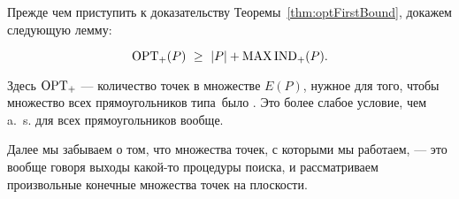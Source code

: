 Прежде чем приступить к доказательству Теоремы~\ref{thm:optFirstBound}, докажем следующую лемму:

\begin{lemma} \label{lm:optPlusBound}
\begin{equation}
	\label{eq:optPlusBound}
	\opt_+(P)\ \ge\ |P| + \maxind_+ (P). %
\end{equation}
\end{lemma}

Здесь $\operatorname{OPT}_+$ — количество точек в множестве $E(P)$, нужное для того, чтобы множество всех прямоугольников типа~\tpl было \arbs. Это более слабое условие, чем a.~s. для всех прямоугольников вообще.

Далее мы забываем о том, что множества точек, с которыми мы работаем, — это вообще говоря выходы какой-то процедуры поиска, и рассматриваем произвольные конечные множества точек на плоскости.

